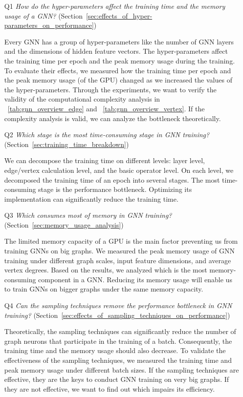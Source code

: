 \begin{itemize}

    \item[Q1] \emph{How do the hyper-parameters affect the training time and the memory usage of a GNN?} (Section~\ref{sec:effects_of_hyper-parameters_on_performance})

          Every GNN has a group of hyper-parameters like the number of GNN layers and the dimensions of hidden feature vectors. The hyper-parameters affect the training time per epoch and the peak memory usage during the training.
          To evaluate their effects, we measured how the training time per epoch and the peak memory usage (of the GPU) changed as we increased the values of the hyper-parameters.
          Through the experiments, we want to verify the validity of the computational complexity analysis in \tablename~\ref{tab:gnn_overview_edge} and \tablename~\ref{tab:gnn_overview_vertex}.
          If the complexity analysis is valid, we can analyze the bottleneck theoretically.

    \item[Q2] \emph{Which stage is the most time-consuming stage in GNN training?} (Section~\ref{sec:training_time_breakdown})

          We can decompose the training time on different levels: layer level, edge/vertex calculation level, and the basic operator level.
          On each level, we decomposed the training time of an epoch into several stages. The most time-consuming stage is the performance bottleneck.
          Optimizing its implementation can significantly reduce the training time.

    \item[Q3] \emph{Which consumes most of memory in GNN training?} (Section~\ref{sec:memory_usage_analysis})

          The limited memory capacity of a GPU is the main factor preventing us from training GNNs on big graphs.
          We measured the peak memory usage of GNN training under different graph scales, input feature dimensions, and average vertex degrees.
          Based on the results, we analyzed which is the most memory-consuming component in a GNN.
          Reducing its memory usage will enable us to train GNNs on bigger graphs under the same memory capacity.

    \item[Q4] \emph{Can the sampling techniques remove the performance bottleneck in GNN training?} (Section~\ref{sec:effects_of_sampling_techniques_on_performance})

          Theoretically, the sampling techniques can significantly reduce the number of graph neurons that participate in the training of a batch.
          Consequently, the training time and the memory usage should also decrease.
          To validate the effectiveness of the sampling techniques, we measured the training time and peak memory usage under different batch sizes.
          If the sampling techniques are effective, they are the keys to conduct GNN training on very big graphs.
          If they are not effective, we want to find out which impairs its efficiency.
\end{itemize}


